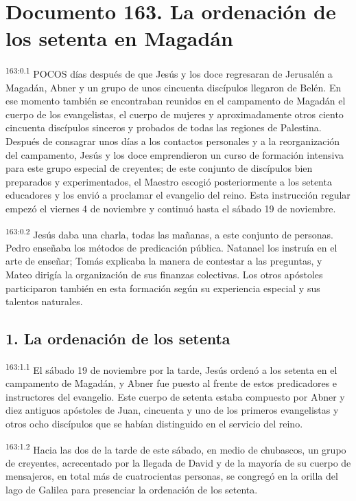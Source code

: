 \chapter{Documento 163. La ordenación de los setenta en Magadán}
\par 
\textsuperscript{163:0.1} POCOS días después de que Jesús y los doce regresaran de Jerusalén a Magadán, Abner y un grupo de unos cincuenta discípulos llegaron de Belén. En ese momento también se encontraban reunidos en el campamento de Magadán el cuerpo de los evangelistas, el cuerpo de mujeres y aproximadamente otros ciento cincuenta discípulos sinceros y probados de todas las regiones de Palestina. Después de consagrar unos días a los contactos personales y a la reorganización del campamento, Jesús y los doce emprendieron un curso de formación intensiva para este grupo especial de creyentes; de este conjunto de discípulos bien preparados y experimentados, el Maestro escogió posteriormente a los setenta educadores y los envió a proclamar el evangelio del reino. Esta instrucción regular empezó el viernes 4 de noviembre y continuó hasta el sábado 19 de noviembre.

\par 
\textsuperscript{163:0.2} Jesús daba una charla, todas las mañanas, a este conjunto de personas. Pedro enseñaba los métodos de predicación pública. Natanael los instruía en el arte de enseñar; Tomás explicaba la manera de contestar a las preguntas, y Mateo dirigía la organización de sus finanzas colectivas. Los otros apóstoles participaron también en esta formación según su experiencia especial y sus talentos naturales.

\section*{1. La ordenación de los setenta}
\par 
\textsuperscript{163:1.1} El sábado 19 de noviembre por la tarde, Jesús ordenó a los setenta en el campamento de Magadán, y Abner fue puesto al frente de estos predicadores e instructores del evangelio. Este cuerpo de setenta estaba compuesto por Abner y diez antiguos apóstoles de Juan, cincuenta y uno de los primeros evangelistas y otros ocho discípulos que se habían distinguido en el servicio del reino.

\par 
\textsuperscript{163:1.2} Hacia las dos de la tarde de este sábado, en medio de chubascos, un grupo de creyentes, acrecentado por la llegada de David y de la mayoría de su cuerpo de mensajeros, en total más de cuatrocientas personas, se congregó en la orilla del lago de Galilea para presenciar la ordenación de los setenta.

